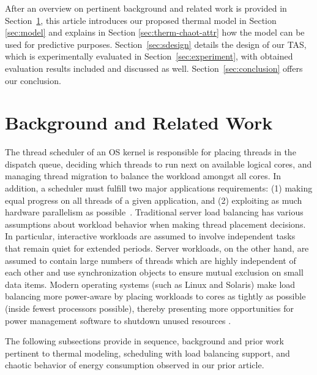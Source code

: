 \documentclass[times, 10pt,twocolumn]{IEEEtran}
\begin{document}
After an overview on pertinent background and related work is provided
in Section~\ref{sec:related}, this article introduces our proposed
thermal model in Section \ref{sec:model} and explains in Section
\ref{sec:therm-chaot-attr} how the model can be used for predictive
purposes.  Section~\ref{sec:sdesign} details the design of our TAS,
which is experimentally evaluated in Section~\ref{sec:experiment}, with
obtained evaluation results included and discussed as well.
Section~\ref{sec:conclusion} offers our conclusion.

\section{Background and Related Work}
\label{sec:related}
The thread scheduler of an OS kernel is responsible for placing threads
in the dispatch queue, deciding which threads to run next on available
logical cores, and managing thread migration to balance the workload
amongst all cores.  In addition, a scheduler must fulfill two major
applications requirements: (1) making equal progress on all threads of a
given application, and (2) exploiting as much hardware parallelism as
possible~\cite{Hofmeyr2010}. Traditional server load balancing has
various assumptions about workload behavior when making thread placement
decisions.  In particular, interactive workloads are assumed to involve
independent tasks that remain quiet for extended periods.  Server
workloads, on the other hand, are assumed to contain large numbers of
threads which are highly independent of each other and use
synchronization objects to ensure mutual exclusion on small data items.
Modern operating systems (such as Linux and Solaris) make load balancing
more power-aware by placing workloads to cores as tightly as possible
(inside fewest processors possible), thereby presenting more
opportunities for power management software to shutdown unused resources
\cite{Sun2009,Sun2009b,Xia2010}.

The following subsections provide in sequence, background and prior work
pertinent to thermal modeling, scheduling with load balancing support,
and chaotic behavior of energy consumption observed in our prior
article.
\end{document}
